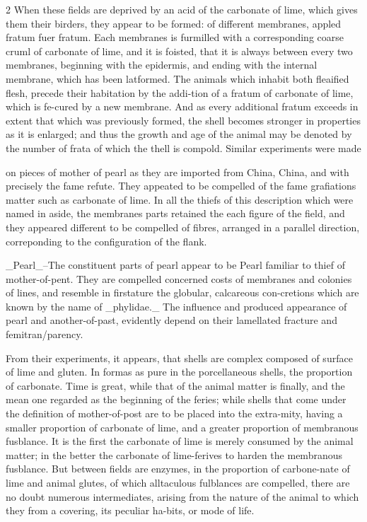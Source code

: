 \documentclass[10pt]{article}
\begin{document}
\begin{multicols}{2}
When these fields are deprived by an acid of the carbonate of lime, which gives them their birders, they appear to be formed: of different membranes, appled fratum fuer fratum. Each membranes is furmilled with a corresponding coarse cruml of carbonate of lime, and it is foisted, that it is always between every two membranes, beginning with the epidermis, and ending with the internal membrane, which has been latformed. The animals which inhabit both fleaified flesh, precede their habitation by the addi-tion of a fratum of carbonate of lime, which is fe-cured by a new membrane. And as every additional fratum exceeds in extent that which was previously formed, the shell becomes stronger in properties as it is enlarged; and thus the growth and age of the animal may be denoted by the number of frata of which the thell is compold. Similar experiments were made

on pieces of mother of pearl as they are imported from China, China, and with precisely the fame refute. They appeated to be compelled of the fame grafiations matter such as carbonate of lime. In all the thiefs of this description which were named in aside, the membranes parts retained the each figure of the field, and they appeared different to be compelled of fibres, arranged in a parallel direction, correponding to the configuration of the flank.

\_Pearl\_--The constituent parts of pearl appear to be Pearl familiar to thief of mother-of-pent. They are compelled concerned costs of membranes and colonies of lines, and resemble in firstature the globular, calcareous con-cretions which are known by the name of \_phylidae.\_ The influence and produced appearance of pearl and another-of-past, evidently depend on their lamellated fracture and femitran/parency.

From their experiments, it appears, that shells are complex composed of surface of lime and gluten. In formas as pure in the porcellaneous shells, the proportion of carbonate. Time is great, while that of the animal matter is finally, and the mean one regarded as the beginning of the feries; while shells that come under the definition of mother-of-post are to be placed into the extra-mity, having a smaller proportion of carbonate of lime, and a greater proportion of membranous fusblance. It is the first the carbonate of lime is merely consumed by the animal matter; in the better the carbonate of lime-ferives to harden the membranous fusblance. But between fields are enzymes, in the proportion of carbone-nate of lime and animal glutes, of which alltaculous fulblances are compelled, there are no doubt numerous intermediates, arising from the nature of the animal to which they from a covering, its peculiar ha-bits, or mode of life.


\end{multicols}
\end{document}
